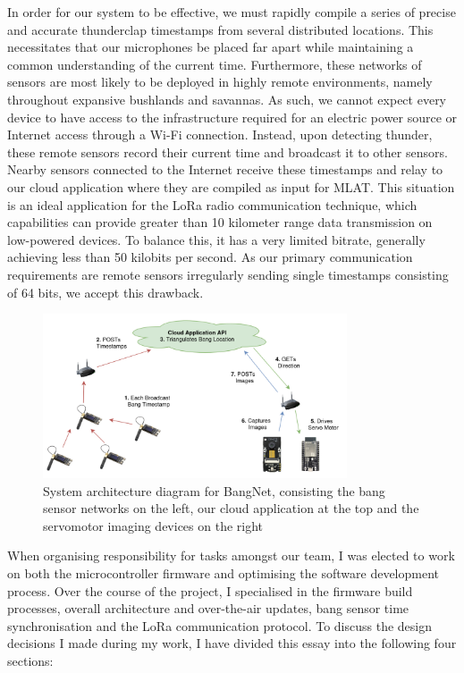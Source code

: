 \documentclass[conference]{IEEEtran}
\begin{document}
In order for our system to be effective, we must rapidly compile a series of precise and accurate thunderclap timestamps from several distributed locations. This necessitates that our microphones be placed far apart while maintaining a common understanding of the current time. Furthermore, these networks of sensors are most likely to be deployed in highly remote environments, namely throughout expansive bushlands and savannas. As such, we cannot expect every device to have access to the infrastructure required for an electric power source or Internet access through a Wi-Fi connection. Instead, upon detecting thunder, these remote sensors record their current time and broadcast it to other sensors. Nearby sensors connected to the Internet receive these timestamps and relay to our cloud application where they are compiled as input for MLAT. This situation is an ideal application for the LoRa radio communication technique, which capabilities can provide greater than 10 kilometer range data transmission on low-powered devices. To balance this, it has a very limited bitrate, generally achieving less than 50 kilobits per second. As our primary communication requirements are remote sensors irregularly sending single timestamps consisting of 64 bits, we accept this drawback.

\begin{figure}[ht]
\centerline{\includegraphics[width=90mm]{images/architecture.png}}
\caption{System architecture diagram for BangNet, consisting the bang sensor networks on the left, our cloud application at the top and the servomotor imaging devices on the right}
\label{architecture_figure}
\end{figure}

When organising responsibility for tasks amongst our team, I was elected to work on both the microcontroller firmware and optimising the software development process. Over the course of the project, I specialised in the firmware build processes, overall architecture and over-the-air updates, bang sensor time synchronisation and the LoRa communication protocol. To discuss the design decisions I made during my work, I have divided this essay into the following four sections:
\end{document}
